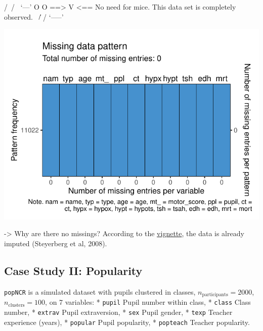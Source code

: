 \documentclass[
]{jss}
\begin{document}
\begin{CodeChunk}
\begin{CodeOutput}
 /\     /\
{  `---'  }
{  O   O  }
==>  V <==  No need for mice. This data set is completely observed.
 \  \|/  /
  `-----'
\end{CodeOutput}


\begin{center}\includegraphics{Manuscript_files/figure-latex/impact-1} \end{center}

\end{CodeChunk}

-\textgreater{} Why are there no missings? According to the
\href{https://cran.r-project.org/web/packages/metamisc/metamisc.pdf}{vignette},
the data is already imputed (Steyerberg et al, 2008).

\hypertarget{case-study-ii-popularity}{%
\subsection{Case Study II: Popularity}\label{case-study-ii-popularity}}

\texttt{popNCR} is a simulated dataset with pupils clustered in classes,
\(n_{\text{participants}} = 2000\), \(n_{\text{clusters}} = 100\), on 7
variables: * \texttt{pupil} Pupil number within class, * \texttt{class}
Class number, * \texttt{extrav} Pupil extraversion, * \texttt{sex} Pupil
gender, * \texttt{texp} Teacher experience (years), * \texttt{popular}
Pupil popularity, * \texttt{popteach} Teacher popularity.
\end{document}
